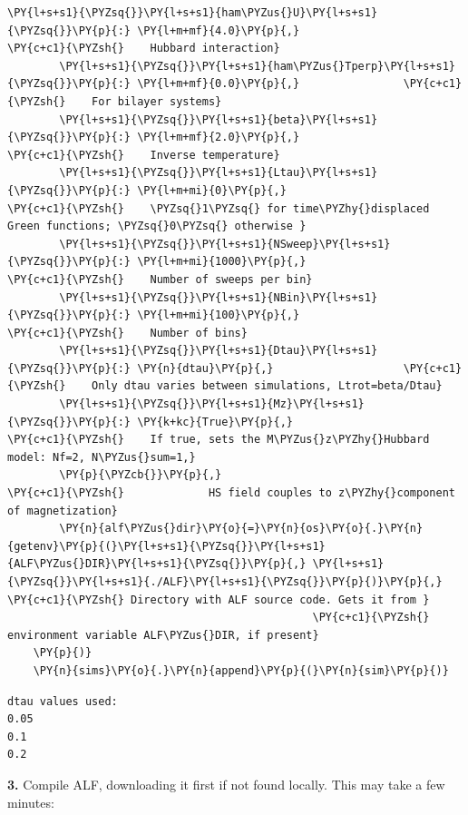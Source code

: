 \begin{tcolorbox}[breakable, size=fbox, boxrule=1pt, pad at break*=1mm,colback=cellbackground, colframe=cellborder]
\begin{Verbatim}[commandchars=\\\{\}]
        \PY{l+s+s1}{\PYZsq{}}\PY{l+s+s1}{ham\PYZus{}U}\PY{l+s+s1}{\PYZsq{}}\PY{p}{:} \PY{l+m+mf}{4.0}\PY{p}{,}                    \PY{c+c1}{\PYZsh{}    Hubbard interaction}
        \PY{l+s+s1}{\PYZsq{}}\PY{l+s+s1}{ham\PYZus{}Tperp}\PY{l+s+s1}{\PYZsq{}}\PY{p}{:} \PY{l+m+mf}{0.0}\PY{p}{,}                \PY{c+c1}{\PYZsh{}    For bilayer systems}
        \PY{l+s+s1}{\PYZsq{}}\PY{l+s+s1}{beta}\PY{l+s+s1}{\PYZsq{}}\PY{p}{:} \PY{l+m+mf}{2.0}\PY{p}{,}                     \PY{c+c1}{\PYZsh{}    Inverse temperature}
        \PY{l+s+s1}{\PYZsq{}}\PY{l+s+s1}{Ltau}\PY{l+s+s1}{\PYZsq{}}\PY{p}{:} \PY{l+m+mi}{0}\PY{p}{,}                       \PY{c+c1}{\PYZsh{}    \PYZsq{}1\PYZsq{} for time\PYZhy{}displaced Green functions; \PYZsq{}0\PYZsq{} otherwise }
        \PY{l+s+s1}{\PYZsq{}}\PY{l+s+s1}{NSweep}\PY{l+s+s1}{\PYZsq{}}\PY{p}{:} \PY{l+m+mi}{1000}\PY{p}{,}                  \PY{c+c1}{\PYZsh{}    Number of sweeps per bin}
        \PY{l+s+s1}{\PYZsq{}}\PY{l+s+s1}{NBin}\PY{l+s+s1}{\PYZsq{}}\PY{p}{:} \PY{l+m+mi}{100}\PY{p}{,}                     \PY{c+c1}{\PYZsh{}    Number of bins}
        \PY{l+s+s1}{\PYZsq{}}\PY{l+s+s1}{Dtau}\PY{l+s+s1}{\PYZsq{}}\PY{p}{:} \PY{n}{dtau}\PY{p}{,}                    \PY{c+c1}{\PYZsh{}    Only dtau varies between simulations, Ltrot=beta/Dtau}
        \PY{l+s+s1}{\PYZsq{}}\PY{l+s+s1}{Mz}\PY{l+s+s1}{\PYZsq{}}\PY{p}{:} \PY{k+kc}{True}\PY{p}{,}                      \PY{c+c1}{\PYZsh{}    If true, sets the M\PYZus{}z\PYZhy{}Hubbard model: Nf=2, N\PYZus{}sum=1,}
        \PY{p}{\PYZcb{}}\PY{p}{,}                               \PY{c+c1}{\PYZsh{}             HS field couples to z\PYZhy{}component of magnetization}
        \PY{n}{alf\PYZus{}dir}\PY{o}{=}\PY{n}{os}\PY{o}{.}\PY{n}{getenv}\PY{p}{(}\PY{l+s+s1}{\PYZsq{}}\PY{l+s+s1}{ALF\PYZus{}DIR}\PY{l+s+s1}{\PYZsq{}}\PY{p}{,} \PY{l+s+s1}{\PYZsq{}}\PY{l+s+s1}{./ALF}\PY{l+s+s1}{\PYZsq{}}\PY{p}{)}\PY{p}{,} \PY{c+c1}{\PYZsh{} Directory with ALF source code. Gets it from }
                                               \PY{c+c1}{\PYZsh{} environment variable ALF\PYZus{}DIR, if present}
    \PY{p}{)}
    \PY{n}{sims}\PY{o}{.}\PY{n}{append}\PY{p}{(}\PY{n}{sim}\PY{p}{)}
\end{Verbatim}
\end{tcolorbox}

    \begin{Verbatim}[commandchars=\\\{\}]
dtau values used:
0.05
0.1
0.2
    \end{Verbatim}

    \textbf{3.} Compile ALF, downloading it first if not found locally. This
may take a few minutes:

